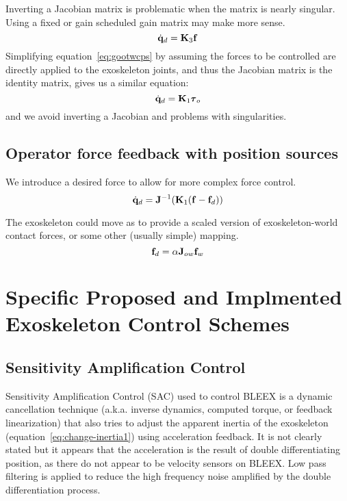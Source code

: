 \documentclass[letterpaper,12pt,fullpage]{article}
\begin{document}
Inverting a Jacobian matrix is problematic when the matrix is
nearly singular.
Using a fixed or gain scheduled gain matrix may make more sense.
\begin{equation}
\dot{{\bf q}}_d = {\bf K}_3 {\bf f}
\end{equation}
Simplifying equation~\ref{eq:gootwcps}
by assuming the forces to be controlled
are directly applied to the exoskeleton joints, and thus the Jacobian matrix
is the identity matrix, gives us a similar equation:
\begin{equation}
\dot{\vq}_d = \mK_1 \vtau_o
\end{equation}
and we avoid inverting a Jacobian and problems with singularities.

\subsection{Operator force feedback with position sources}

We introduce a desired force to allow for more complex force control.
\begin{equation}
\dot{{\bf q}}_d = {\bf J}^{-1} ({\bf K}_1 ({\bf f} - {\bf f}_d))
\end{equation}

The exoskeleton could move as to provide a scaled version of exoskeleton-world
contact forces, or some other (usually simple) mapping. 
\begin{equation}
{\bf f}_d = \alpha {\bf J}_{ow} {\bf f}_w
\end{equation}

\section{Specific Proposed and Implmented Exoskeleton Control Schemes}

\subsection{Sensitivity Amplification Control}

Sensitivity Amplification Control (SAC) used to control BLEEX
is a dynamic cancellation technique (a.k.a.
inverse dynamics, computed torque, or feedback linearization) that also tries
to adjust the apparent inertia of the exoskeleton (equation~\ref{eq:change-inertia1})
using acceleration feedback. It is not clearly stated but it appears that the
acceleration is the result of double differentiating position, as there do not
appear to be velocity sensors on BLEEX. Low pass filtering is applied to reduce
the high frequency noise amplified by the double differentiation process.
\end{document}
